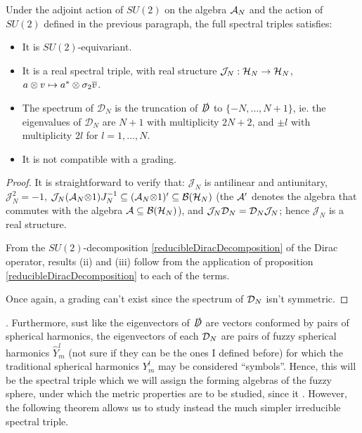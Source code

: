 \begin{theorem}
Under the adjoint action of $SU(2)$ on the algebra $\mathcal A_N$ and the action of $SU(2)$ defined in the previous paragraph, the full spectral triples satisfies:
    \begin{itemize}
    
    \item It is $SU(2)$-equivariant.
    
    \item It is a real spectral triple, with real structure $\mathcal J_N: \mathcal H_N \to \mathcal H_N$, $a \otimes v \mapsto a^* \otimes \sigma_2 \overline{v}$.
    
    \item The spectrum of $\mathcal D_N$ is the truncation of $\slashed D$ to $\{-N, \dots, N+1\}$, ie. the eigenvalues of $\mathcal D_N$ are $N+1$ with multiplicity $2N+2$, and $\pm l$ with multiplicity $2l$ for $l = 1, \dots, N$.
    
    \item It is not compatible with a grading.
    
    \end{itemize}
\end{theorem}

\begin{proof}
It is straightforward to verify that: $\mathcal J_N$ is antilinear and antiunitary, $\mathcal J_N^2 = - 1$, $\mathcal J_N (\mathcal A_N \mathcal\otimes 1) J_N^{-1} \subseteq (\mathcal A_N \mathcal\otimes 1)' \subseteq \mathcal B(\mathcal H_N)$ (the $\mathcal A '$ denotes the algebra that commutes with the algebra $\mathcal A \subseteq \mathcal B(\mathcal H_N)$), and $\mathcal J_N \mathcal D_N = \mathcal D_N \mathcal J_N$; hence $\mathcal J_N$ is a real structure.

From the $SU(2)$-decomposition \eqref{reducibleDiracDecomposition} of the Dirac operator, results (ii) and (iii) follow from the application of proposition \ref{reducibleDiracDecomposition} to each of the terms.

Once again, a grading can't exist since the spectrum of $\mathcal D_N$ isn't symmetric.
\end{proof}

. { \color{gray}
Furthermore, sust like the eigenvectors of $\slashed D$ are vectors conformed by pairs of spherical harmonics, the eigenvectors of each $\mathcal D_N$ are pairs of fuzzy spherical harmonics $\hat Y^l_m$ (not sure if they can be the ones I defined before) for which the traditional spherical harmonics $Y^l_m$ may be considered ``symbols''.
} Hence, this will be the spectral triple which we will assign the forming algebras of the fuzzy sphere, under which the metric properties are to be studied, since it . However, the following theorem allows us to study instead the much simpler irreducible spectral triple.

